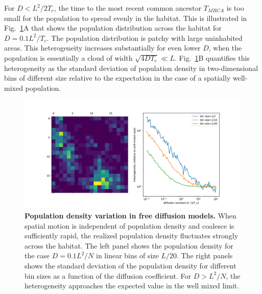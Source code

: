 \documentclass[aps,rmp, onecolumn]{revtex4}
\begin{document}
For $D<L^2/2T_c$, the time to the most recent common ancestor $T_{MRCA}$ is too small for the population to spread evenly in the habitat.
This is illustrated in Fig.~\ref{fig:heterogeneity}A that shows the population distribution across the habitat for $D=0.1L^2/T_c$. 
The population distribution is patchy with large uninhabited areas.
This heterogeneity increases substantially for even lower $D$, when the population is essentially a cloud of width $\sqrt{4DT_c}\ll L$.
Fig.~\ref{fig:heterogeneity}B quantifies this heterogeneity as the standard deviation of population density in two-dimensional bins of different size  relative to the expectation in the case of a spatially well-mixed population. 


\begin{figure}[tb]
    \includegraphics*[width=\textwidth]{figures/heterogeneity_free_diffusion.pdf}
    \caption[short]{\label{fig:heterogeneity}{\bf Population density variation in free diffusion models.}
    When spatial motion is independent of population density and coalesce is sufficiently rapid, the realized population density fluctuates strongly across the habitat. The left panel shows the population density for the case $D = 0.1 L^2/N$ in linear bins of size $L/20$. The right panels shows the standard deviation of the population density for different bin sizes as a function of the diffusion coefficient. For $D>L^2/N$, the heterogeneity approaches the expected value in the well mixed limit. }
\end{figure}
\end{document}

